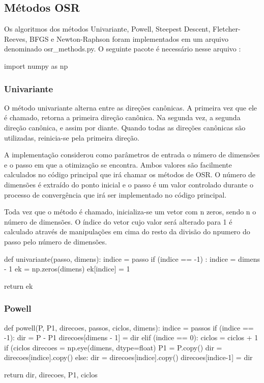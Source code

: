 \documentclass[10pt, a4paper]{article}
\begin{document}
\subsection{Métodos OSR}

Os algoritmos dos métodos Univariante, Powell, Steepest Descent, Fletcher-Reeves, BFGS e Newton-Raphson foram implementados em um arquivo denominado osr\_methods.py. O seguinte pacote é necessário nesse arquivo : 
\begin{python}
  import numpy as np
\end{python}

\subsubsection{Univariante}

O método univariante alterna entre as direções canônicas. A primeira vez que ele é chamado, retorna a primeira direção canônica. Na segunda vez, a segunda direção canônica, e assim por diante.
Quando todas as direções canônicas são utilizadas, reinicia-se pela primeira direção.

A implementação considerou como parâmetros de entrada o número de dimensões  e o passo em que a otimização se encontra. Ambos valores são facilmente calculados no código principal que irá chamar 
os métodos de OSR. O número de dimensões é extraído do ponto inicial e o passo é um valor controlado durante o processo de convergência que irá ser implementado no código principal.

Toda vez que o método é chamado, inicializa-se um vetor com n zeros, sendo n o número de dimensões. O índice do vetor cujo valor será alterado para 1 é calculado 
através de manipulações em cima do resto da divisão do npumero do passo pelo número de dimensões.

\begin{python}
  def univariante(passo, dimens):
    indice = passo%
    if (indice == -1) :
        indice = dimens - 1
    ek = np.zeros(dimens)
    ek[indice] = 1
    
    return ek
\end{python}

\subsubsection{Powell}


\begin{python}
  def powell(P, P1, direcoes, passos, ciclos, dimens):
    indice = passos%
    if (indice == -1):
        dir = P - P1
        direcoes[dimens - 1] = dir        
    elif (indice == 0):
        ciclos = ciclos + 1
        if (ciclos%
            direcoes = np.eye(dimens, dtype=float)
        P1 = P.copy()
        dir = direcoes[indice].copy()
    else:
        dir = direcoes[indice].copy()
        direcoes[indice-1] = dir
  
    return dir, direcoes, P1, ciclos 
\end{python}
\end{document}
